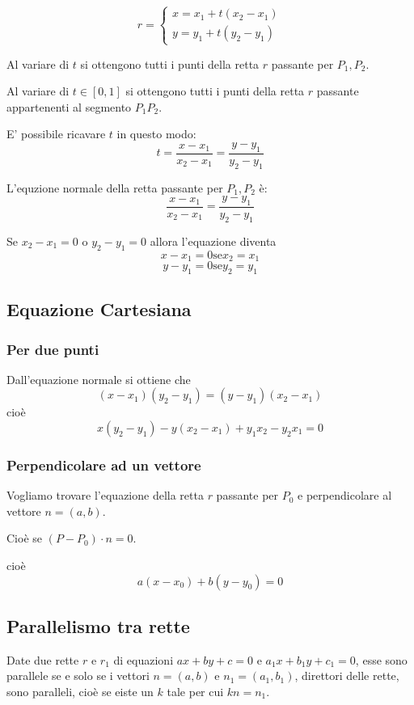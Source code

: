 $$
r=
\begin{cases}
x = x_1 + t(x_2-x_1) \\
y = y_1 + t(y_2-y_1)
\end{cases}
$$

Al variare di $t$ si ottengono tutti i punti della retta $r$ passante per $P_1,P_2$.

Al variare di $t \in [0,1]$ si ottengono tutti i punti della retta $r$ passante appartenenti al segmento $P_1P_2$.

E' possibile ricavare $t$ in questo modo:
$$ t = \frac{x-x_1}{x_2-x_1} = \frac{y-y_1}{y_2-y_1}$$


\begin{definition}
L'equzione normale della retta passante per $P_1,P_2$ è: $$\frac{x-x_1}{x_2-x_1} = \frac{y-y_1}{y_2-y_1}$$
\end{definition}

Se $x_2 - x_1=0$ o $y_2 - y_1=0$ allora l'equazione diventa
$$x-x_1 = 0 \text{se} x_2 = x_1$$
$$y-y_1 = 0 \text{se} y_2 = y_1$$

\subsection{Equazione Cartesiana}

\subsubsection{Per due punti}

Dall'equazione normale si ottiene che
$$(x-x_1)(y_2-y_1) = (y-y_1)(x_2-x_1)$$
cioè
$$x(y_2-y_1)-y(x_2-x_1)+y_1x_2-y_2x_1=0$$


\subsubsection{Perpendicolare ad un vettore}

Vogliamo trovare l'equazione della retta $r$ passante per $P_0$ e perpendicolare al vettore $n=(a,b)$.

Cioè se $(P-P_0)\cdot n = 0$.

cioè $$a(x-x_0)+b(y-y_0) = 0$$

\subsection{Parallelismo tra rette}

Date due rette $r$ e $r_1$ di equazioni $ax+by+c=0$ e $a_1x+b_1y+c_1=0$, esse sono parallele se e solo se i vettori $n  = (a,b)$ e $n_1 = (a_1,b_1)$, direttori delle rette, sono paralleli, cioè se eiste un $k$ tale per cui $kn = n_1$.


